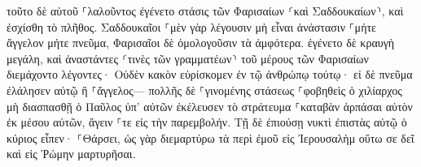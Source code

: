 \documentclass{openreader}
\begin{document}
τοῦτο δὲ αὐτοῦ ⸀λαλοῦντος ἐγένετο στάσις τῶν Φαρισαίων ⸂καὶ Σαδδουκαίων⸃, καὶ ἐσχίσθη τὸ πλῆθος. 
Σαδδουκαῖοι ⸀μὲν γὰρ λέγουσιν μὴ εἶναι ἀνάστασιν ⸀μήτε ἄγγελον μήτε πνεῦμα, Φαρισαῖοι δὲ ὁμολογοῦσιν τὰ ἀμφότερα. 
ἐγένετο δὲ κραυγὴ μεγάλη, καὶ ἀναστάντες ⸂τινὲς τῶν γραμματέων⸃ τοῦ μέρους τῶν Φαρισαίων διεμάχοντο λέγοντες· Οὐδὲν κακὸν εὑρίσκομεν ἐν τῷ ἀνθρώπῳ τούτῳ· εἰ δὲ πνεῦμα ἐλάλησεν αὐτῷ ἢ ⸀ἄγγελος— 
πολλῆς δὲ ⸀γινομένης στάσεως ⸀φοβηθεὶς ὁ χιλίαρχος μὴ διασπασθῇ ὁ Παῦλος ὑπ’ αὐτῶν ἐκέλευσεν τὸ στράτευμα ⸀καταβὰν ἁρπάσαι αὐτὸν ἐκ μέσου αὐτῶν, ἄγειν ⸀τε εἰς τὴν παρεμβολήν. 
Τῇ δὲ ἐπιούσῃ νυκτὶ ἐπιστὰς αὐτῷ ὁ κύριος εἶπεν· ⸀Θάρσει, ὡς γὰρ διεμαρτύρω τὰ περὶ ἐμοῦ εἰς Ἰερουσαλὴμ οὕτω σε δεῖ καὶ εἰς Ῥώμην μαρτυρῆσαι. 
\end{document}
